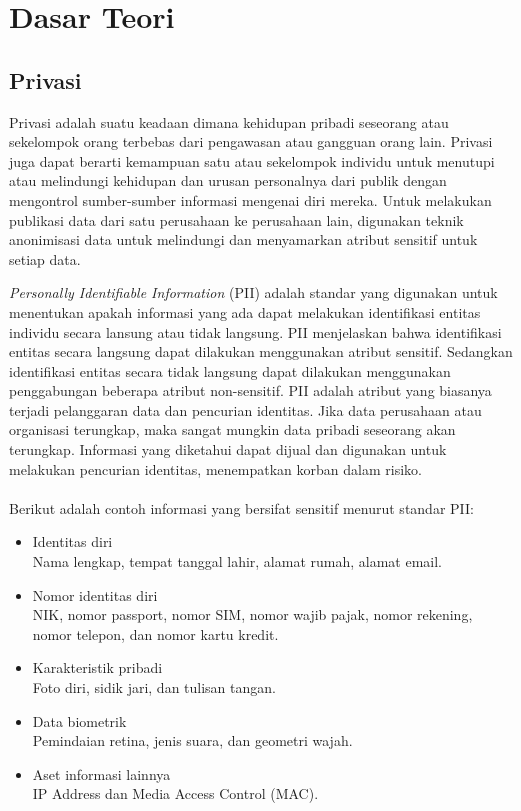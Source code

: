 \chapter{Dasar Teori}
\label{chap:teori}

\section{Privasi}
\label{sec:privasi}
Privasi adalah suatu keadaan dimana kehidupan pribadi seseorang atau sekelompok orang terbebas dari pengawasan atau gangguan orang lain. Privasi juga dapat berarti kemampuan satu atau sekelompok individu untuk menutupi atau melindungi kehidupan dan urusan personalnya dari publik dengan mengontrol sumber-sumber informasi mengenai diri mereka. Untuk melakukan publikasi data dari satu perusahaan ke perusahaan lain, digunakan teknik anonimisasi data untuk melindungi dan menyamarkan atribut sensitif untuk setiap data.

\par \textit{Personally Identifiable Information} (PII) adalah standar yang digunakan untuk menentukan apakah informasi yang ada dapat melakukan identifikasi entitas individu secara lansung atau tidak langsung. PII menjelaskan bahwa identifikasi entitas secara langsung dapat dilakukan menggunakan atribut sensitif. Sedangkan identifikasi entitas secara tidak langsung dapat dilakukan menggunakan penggabungan beberapa atribut non-sensitif. PII adalah atribut  yang biasanya terjadi pelanggaran data dan pencurian identitas. Jika data perusahaan atau organisasi terungkap, maka sangat mungkin data pribadi seseorang akan terungkap. Informasi yang diketahui dapat dijual dan digunakan untuk melakukan pencurian identitas, menempatkan korban dalam risiko.
\\\\
Berikut adalah contoh informasi yang bersifat sensitif menurut standar PII:

\begin{itemize}
\item Identitas diri \\ 
Nama lengkap, tempat tanggal lahir, alamat rumah, alamat email.
\item Nomor identitas diri \\
NIK, nomor passport, nomor SIM, nomor wajib pajak, nomor rekening, nomor telepon, dan nomor kartu kredit.
\item Karakteristik pribadi  \\
Foto diri, sidik jari, dan tulisan tangan.
\item Data biometrik \\
Pemindaian retina, jenis suara, dan geometri wajah.
\item Aset informasi lainnya \\
IP Address dan Media Access Control (MAC). 
\end{itemize}

